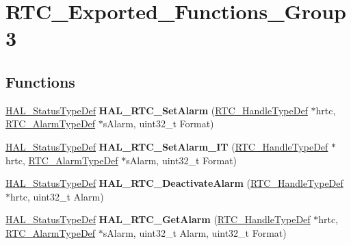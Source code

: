 \hypertarget{group___r_t_c___exported___functions___group3}{}\section{R\+T\+C\+\_\+\+Exported\+\_\+\+Functions\+\_\+\+Group3}
\label{group___r_t_c___exported___functions___group3}
\subsection*{Functions}
\begin{DoxyCompactItemize}
\item 
\hyperlink{stm32f4xx__hal__def_8h_a63c0679d1cb8b8c684fbb0632743478f}{H\+A\+L\+\_\+\+Status\+Type\+Def} {\bfseries H\+A\+L\+\_\+\+R\+T\+C\+\_\+\+Set\+Alarm} (\hyperlink{struct_r_t_c___handle_type_def}{R\+T\+C\+\_\+\+Handle\+Type\+Def} $\ast$hrtc, \hyperlink{struct_r_t_c___alarm_type_def}{R\+T\+C\+\_\+\+Alarm\+Type\+Def} $\ast$s\+Alarm, uint32\+\_\+t Format)\hypertarget{group___r_t_c___exported___functions___group3_gafd78015b93b16dcb9e41a4655a7ea972}{}\label{group___r_t_c___exported___functions___group3_gafd78015b93b16dcb9e41a4655a7ea972}

\item 
\hyperlink{stm32f4xx__hal__def_8h_a63c0679d1cb8b8c684fbb0632743478f}{H\+A\+L\+\_\+\+Status\+Type\+Def} {\bfseries H\+A\+L\+\_\+\+R\+T\+C\+\_\+\+Set\+Alarm\+\_\+\+IT} (\hyperlink{struct_r_t_c___handle_type_def}{R\+T\+C\+\_\+\+Handle\+Type\+Def} $\ast$hrtc, \hyperlink{struct_r_t_c___alarm_type_def}{R\+T\+C\+\_\+\+Alarm\+Type\+Def} $\ast$s\+Alarm, uint32\+\_\+t Format)\hypertarget{group___r_t_c___exported___functions___group3_gab66a7fec05e9d9374de95d5f61e16c16}{}\label{group___r_t_c___exported___functions___group3_gab66a7fec05e9d9374de95d5f61e16c16}

\item 
\hyperlink{stm32f4xx__hal__def_8h_a63c0679d1cb8b8c684fbb0632743478f}{H\+A\+L\+\_\+\+Status\+Type\+Def} {\bfseries H\+A\+L\+\_\+\+R\+T\+C\+\_\+\+Deactivate\+Alarm} (\hyperlink{struct_r_t_c___handle_type_def}{R\+T\+C\+\_\+\+Handle\+Type\+Def} $\ast$hrtc, uint32\+\_\+t Alarm)\hypertarget{group___r_t_c___exported___functions___group3_ga186d852f8aee8a4d0dfeec778be35482}{}\label{group___r_t_c___exported___functions___group3_ga186d852f8aee8a4d0dfeec778be35482}

\item 
\hyperlink{stm32f4xx__hal__def_8h_a63c0679d1cb8b8c684fbb0632743478f}{H\+A\+L\+\_\+\+Status\+Type\+Def} {\bfseries H\+A\+L\+\_\+\+R\+T\+C\+\_\+\+Get\+Alarm} (\hyperlink{struct_r_t_c___handle_type_def}{R\+T\+C\+\_\+\+Handle\+Type\+Def} $\ast$hrtc, \hyperlink{struct_r_t_c___alarm_type_def}{R\+T\+C\+\_\+\+Alarm\+Type\+Def} $\ast$s\+Alarm, uint32\+\_\+t Alarm, uint32\+\_\+t Format)\hypertarget{group___r_t_c___exported___functions___group3_ga4786b652ffee2d59da2c65dd78646405}{}\label{group___r_t_c___exported___functions___group3_ga4786b652ffee2d59da2c65dd78646405}


\end{DoxyCompactItemize}
